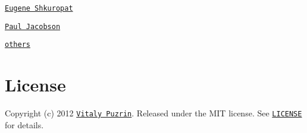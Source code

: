 \begin{DoxyItemize}
\item \href{https://github.com/shkuropat}{\tt Eugene Shkuropat}
\item \href{https://github.com/hpaulj}{\tt Paul Jacobson}
\end{DoxyItemize}

\href{https://github.com/nodeca/argparse/graphs/contributors}{\tt others}

\section*{License }

Copyright (c) 2012 \href{https://github.com/puzrin}{\tt Vitaly Puzrin}. Released under the M\+IT license. See \href{https://github.com/nodeca/argparse/blob/master/LICENSE}{\tt L\+I\+C\+E\+N\+SE} for details. 